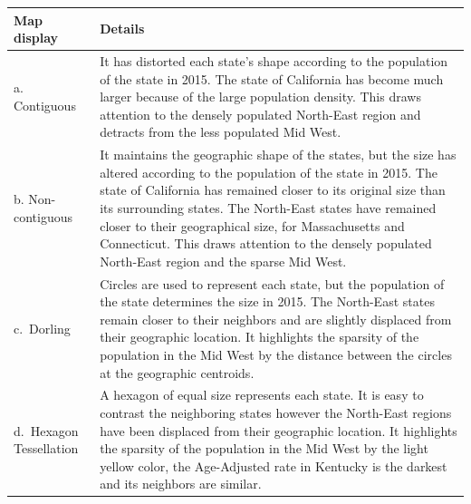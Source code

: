 \documentclass{monashthesis}
\begin{document}
\begin{longtable}[]{@{}ll@{}}
\toprule
\begin{minipage}[b]{0.28\columnwidth}\raggedright
Map display\strut
\end{minipage} & \begin{minipage}[b]{0.66\columnwidth}\raggedright
Details\strut
\end{minipage}\tabularnewline
\midrule
\endhead
\begin{minipage}[t]{0.28\columnwidth}\raggedright
a. Contiguous\strut
\end{minipage} & \begin{minipage}[t]{0.66\columnwidth}\raggedright
It has distorted each state's shape according to the population of the state in 2015. The state of California has become much larger because of the large population density. This draws attention to the densely populated North-East region and detracts from the less populated Mid West.\strut
\end{minipage}\tabularnewline
\begin{minipage}[t]{0.28\columnwidth}\raggedright
b. Non-contiguous\strut
\end{minipage} & \begin{minipage}[t]{0.66\columnwidth}\raggedright
It maintains the geographic shape of the states, but the size has altered according to the population of the state in 2015. The state of California has remained closer to its original size than its surrounding states. The North-East states have remained closer to their geographical size, for Massachusetts and Connecticut. This draws attention to the densely populated North-East region and the sparse Mid West.\strut
\end{minipage}\tabularnewline
\begin{minipage}[t]{0.28\columnwidth}\raggedright
c.~Dorling\strut
\end{minipage} & \begin{minipage}[t]{0.66\columnwidth}\raggedright
Circles are used to represent each state, but the population of the state determines the size in 2015. The North-East states remain closer to their neighbors and are slightly displaced from their geographic location. It highlights the sparsity of the population in the Mid West by the distance between the circles at the geographic centroids.\strut
\end{minipage}\tabularnewline
\begin{minipage}[t]{0.28\columnwidth}\raggedright
d.~Hexagon Tessellation\strut
\end{minipage} & \begin{minipage}[t]{0.66\columnwidth}\raggedright
A hexagon of equal size represents each state. It is easy to contrast the neighboring states however the North-East regions have been displaced from their geographic location. It highlights the sparsity of the population in the Mid West by the light yellow color, the Age-Adjusted rate in Kentucky is the darkest and its neighbors are similar.\strut
\end{minipage}\tabularnewline
\bottomrule
\end{longtable}
\end{document}
